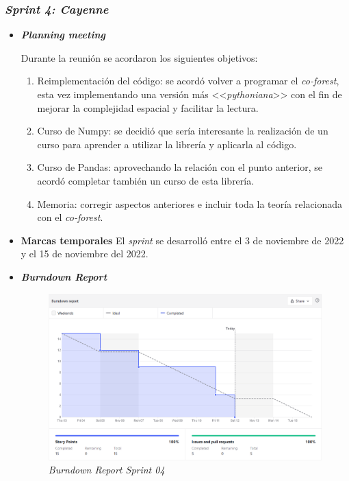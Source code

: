 \subsubsection{\textit{Sprint 4: Cayenne}}
\begin{itemize}
	\item \textbf{\textit{Planning meeting}}
	
	Durante la reunión se acordaron los siguientes objetivos:
	
	\begin{enumerate}
		\item Reimplementación del código: se acordó volver a programar el \textit{co-forest}, esta vez implementando una versión más <<\textit{pythoniana}>> con el fin de mejorar la complejidad espacial y facilitar la lectura.
		\item Curso de Numpy: se decidió que sería interesante la realización de un curso para aprender a utilizar la librería y aplicarla al código.
		\item Curso de Pandas: aprovechando la relación con el punto anterior, se acordó completar también un curso de esta librería.
		\item Memoria: corregir aspectos anteriores e incluir toda la teoría relacionada con el \textit{co-forest}.
	\end{enumerate}
	
	\item \textbf{Marcas temporales}
	El \textit{sprint} se desarrolló entre el 3 de noviembre de 2022 y el 15 de noviembre del 2022.
			
	\item \textbf{\textit{Burndown Report}}
	\begin{figure}[h]
		\caption{\textit{Burndown Report Sprint 04}}
		\centering
		\includegraphics[width=\textwidth]{../img/anexos/s04_bdr}
	\end{figure}
	

\end{itemize}
